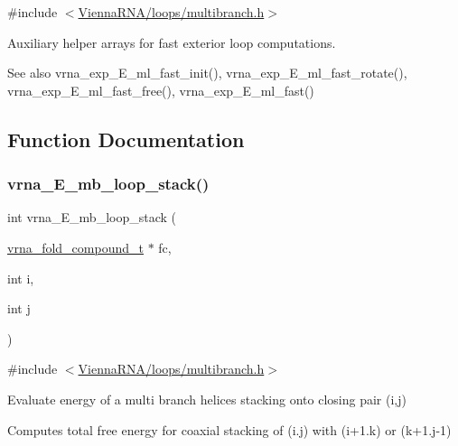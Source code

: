 {\ttfamily \#include $<$\hyperlink{multibranch_8h}{Vienna\+R\+N\+A/loops/multibranch.\+h}$>$}



Auxiliary helper arrays for fast exterior loop computations. 

\begin{DoxySeeAlso}{See also}
vrna\+\_\+exp\+\_\+\+E\+\_\+ml\+\_\+fast\+\_\+init(), vrna\+\_\+exp\+\_\+\+E\+\_\+ml\+\_\+fast\+\_\+rotate(), vrna\+\_\+exp\+\_\+\+E\+\_\+ml\+\_\+fast\+\_\+free(), vrna\+\_\+exp\+\_\+\+E\+\_\+ml\+\_\+fast() 
\end{DoxySeeAlso}


\subsection{Function Documentation}
\mbox{\label{group__eval__loops__mb_ga91af6d5fcb0aef243a4071cf9e718020}} 
\subsubsection{\texorpdfstring{vrna\+\_\+\+E\+\_\+mb\+\_\+loop\+\_\+stack()}{vrna\_E\_mb\_loop\_stack()}}
{\footnotesize\ttfamily int vrna\+\_\+\+E\+\_\+mb\+\_\+loop\+\_\+stack (\begin{DoxyParamCaption}\item[{\hyperlink{group__fold__compound_ga1b0cef17fd40466cef5968eaeeff6166}{vrna\+\_\+fold\+\_\+compound\+\_\+t} $\ast$}]{fc,  }\item[{int}]{i,  }\item[{int}]{j }\end{DoxyParamCaption})}



{\ttfamily \#include $<$\hyperlink{multibranch_8h}{Vienna\+R\+N\+A/loops/multibranch.\+h}$>$}



Evaluate energy of a multi branch helices stacking onto closing pair (i,j) 

Computes total free energy for coaxial stacking of (i.\+j) with (i+1.k) or (k+1.j-\/1) 